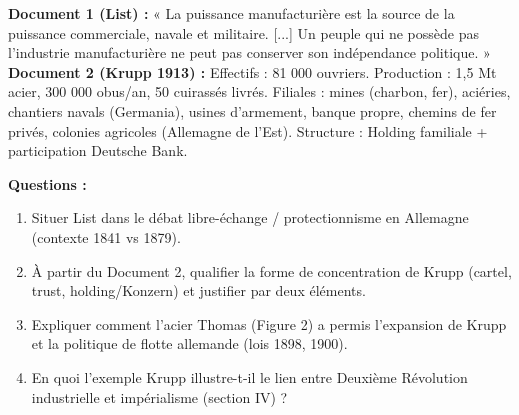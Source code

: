 \documentclass[11pt]{article}
\begin{document}
\begin{exercice}
\textbf{Document 1 (List) :} « La puissance manufacturière est la source de la puissance commerciale, navale et militaire. [...] Un peuple qui ne possède pas l'industrie manufacturière ne peut pas conserver son indépendance politique. »
\textbf{Document 2 (Krupp 1913) :} Effectifs : 81 000 ouvriers. Production : 1,5 Mt acier, 300 000 obus/an, 50 cuirassés livrés. Filiales : mines (charbon, fer), aciéries, chantiers navals (Germania), usines d'armement, banque propre, chemins de fer privés, colonies agricoles (Allemagne de l'Est). Structure : Holding familiale + participation Deutsche Bank.

\textbf{Questions :}
\begin{enumerate}
    \item Situer List dans le débat libre-échange / protectionnisme en Allemagne (contexte 1841 vs 1879).
    \item À partir du Document 2, qualifier la forme de concentration de Krupp (cartel, trust, holding/Konzern) et justifier par deux éléments.
    \item Expliquer comment l'acier Thomas (Figure 2) a permis l'expansion de Krupp et la politique de flotte allemande (lois 1898, 1900).
    \item En quoi l'exemple Krupp illustre-t-il le lien entre Deuxième Révolution industrielle et impérialisme (section IV) ?
\end{enumerate}
\end{exercice}
\end{document}
